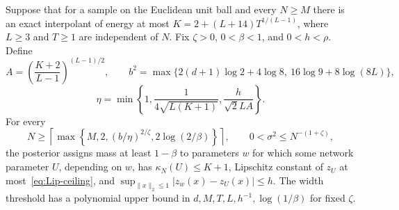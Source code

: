 \begin{lemma}\label{lem:finite-ceiling}
Suppose that for a sample on the Euclidean unit ball and every
$N\ge M$ there is an exact interpolant of energy at most
$K=2+(L+14)T^{1/(L-1)}$, where $L\ge3$ and $T\ge1$ are independent
of $N$. Fix $\zeta>0$, $0<\beta<1$, and $0<h<\rho$.
Define
\[
 A=\left(\frac{K+2}{L-1}\right)^{(L-1)/2},\qquad
 b^2=\max\{2(d+1)\log2+4\log8,\ 16\log9+8\log(8L)\},
\]
\[
 \eta=\min\left\{1,\frac1{4\sqrt{L(K+1)}},
                         \frac h{\sqrt2 LA}\right\}.
\]
For every
\begin{equation}\label{eq:width-threshold}
 N\ge\left\lceil\max\left\{M,2,(b/\eta)^{2/\zeta},
                         2\log(2/\beta)\right\}\right\rceil,
 \qquad 0<\sigma^2\le N^{-(1+\zeta)},
\end{equation}
the posterior assigns mass at least $1-\beta$ to parameters $w$ for which
some network parameter $U$, depending on $w$, has $\kappa_N(U)\le K+1$,
Lipschitz constant of $z_U$ at most~\eqref{eq:Lip-ceiling}, and
$\sup_{\|x\|_2\le1}|z_w(x)-z_U(x)|\le h$.
The width threshold has a polynomial upper bound in
$d,M,T,L,h^{-1},\log(1/\beta)$ for fixed $\zeta$.
\end{lemma}
